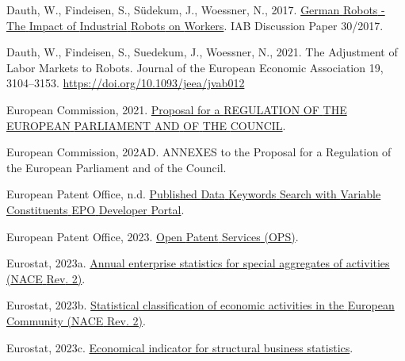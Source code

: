 \documentclass[
  11,
  a4paperpaper,
]{article}
\newlength{\cslhangindent}
\newenvironment{CSLReferences}[2] %
 {\begin{list}{}{%
  \setlength{\itemindent}{0pt}
  \setlength{\leftmargin}{0pt}
  \setlength{\parsep}{0pt}
  \ifodd #1
   \setlength{\leftmargin}{\cslhangindent}
   \setlength{\itemindent}{-1\cslhangindent}
  \fi
  \setlength{\itemsep}{#2\baselineskip}}}
 {\end{list}}
\begin{document}
\begin{CSLReferences}{1}{0}
Dauth, W., Findeisen, S., Südekum, J., Woessner, N., 2017.
\href{https://ssrn.com/abstract=3039031}{German {Robots} - {The}
{Impact} of {Industrial} {Robots} on {Workers}}. IAB Discussion Paper
30/2017.

Dauth, W., Findeisen, S., Suedekum, J., Woessner, N., 2021. The
{Adjustment} of {Labor} {Markets} to {Robots}. Journal of the European
Economic Association 19, 3104--3153.
\url{https://doi.org/10.1093/jeea/jvab012}

European Commission, 2021.
\href{https://eur-lex.europa.eu/legal-content/EN/TXT/HTML/?uri=CELEX:52021PC0206}{Proposal
for a {REGULATION} {OF} {THE} {EUROPEAN} {PARLIAMENT} {AND} {OF} {THE}
{COUNCIL}}.

European Commission, 202AD. {ANNEXES} to the {Proposal} for a
{Regulation} of the {European} {Parliament} and of the {Council}.

European Patent Office, n.d.
\href{https://developers.epo.org/ops-v3-2/apis/get/published-data/search/\%7Bconstituent\%7D}{Published
{Data} {Keywords} {Search} with {Variable} {Constituents} {\textbar}
{EPO} {Developer} {Portal}}.

European Patent Office, 2023.
\href{https://developers.epo.org/ops-v3-2/apis}{Open {Patent} {Services}
({OPS})}.

Eurostat, 2023a.
\href{https://ec.europa.eu/eurostat/databrowser/view/sbs_na_sca_r2/default/table?lang=en}{Annual
enterprise statistics for special aggregates of activities ({NACE}
{Rev}. 2)}.

Eurostat, 2023b.
\href{https://ec.europa.eu/eurostat/api/dissemination/sdmx/2.1/codelist/ESTAT/NACE_R2/?compressed=true&format=TSV&lang=en}{Statistical
classification of economic activities in the {European} {Community}
({NACE} {Rev}. 2)}.

Eurostat, 2023c.
\href{https://ec.europa.eu/eurostat/api/dissemination/sdmx/2.1/codelist/ESTAT/INDIC_SB/?compressed=true&format=TSV&lang=en}{Economical
indicator for structural business statistics}.


\end{CSLReferences}
\end{document}
